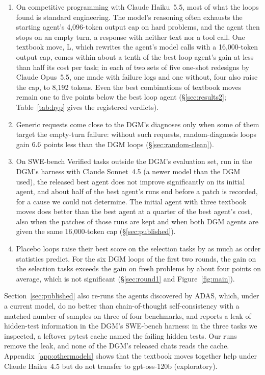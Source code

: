 \begin{enumerate}\setlength{\itemsep}{1pt}
\item On competitive programming with Claude Haiku~5.5, most of what the loops found is standard engineering. The
model's reasoning often exhausts the starting agent's 4{,}096-token output cap on hard problems, and the agent then stops on an
empty turn, a response with neither text nor a tool call. One textbook move, L, which rewrites the agent's model calls
with a 16{,}000-token output cap, comes within about a tenth of the best loop agent's gain at less than half its cost
per task; in each of two sets of five one-shot redesigns by Claude Opus~5.5, one made with failure logs and one without,
four also raise the cap, to 8{,}192 tokens. Even the best combinations of textbook moves remain one to five points below the best loop agent
(\S\ref{sec:results2}; Table~\ref{tab:hyp} gives the registered verdicts).
\item Generic requests come close to the DGM's diagnoses only when some of them target the empty-turn failure: without
such requests, random-diagnosis loops gain $6.6$ points less than the DGM loops (\S\ref{sec:random-clean}).
\item On SWE-bench Verified tasks outside the DGM's evaluation set, run in the DGM's harness with Claude Sonnet~4.5 (a newer model than the
DGM used), the released best agent does not improve significantly on its initial agent, and about half of the best agent's runs end
before a patch is recorded, for a cause we could not determine. The initial agent with three textbook moves does better than the best agent at a quarter of
the best agent's cost, also when the patches of those runs are kept and when both DGM agents are given the same
16{,}000-token cap (\S\ref{sec:published}).
\item Placebo loops raise their best score on the selection tasks by as much as order statistics predict. For the six DGM
loops of the first two rounds, the gain on the selection tasks exceeds the gain on fresh problems by about four points
on average, which is not significant (\S\ref{sec:round1} and Figure~\ref{fig:main}).
\end{enumerate}
Section~\ref{sec:published} also re-runs the agents discovered by ADAS, which, under a current model, do no better than chain-of-thought
self-consistency with a matched number of samples on three of four benchmarks, and reports a leak of hidden-test
information in the DGM's SWE-bench harness: in the three tasks we inspected, a leftover pytest cache named the failing
hidden tests. Our runs remove the leak, and none of the DGM's released chats reads the cache. Appendix~\ref{app:othermodels}
shows that the textbook moves together help under Claude Haiku~4.5 but do not transfer to gpt-oss-120b (exploratory).
